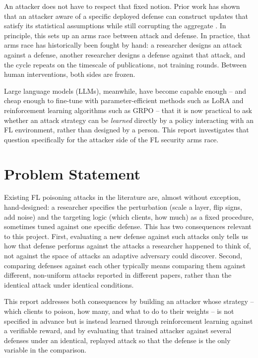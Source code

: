 An attacker does not have to respect that fixed notion. Prior work has shown that an attacker aware of a specific deployed defense can construct updates that satisfy its statistical assumptions while still corrupting the aggregate \citep{fang2020,bhagoji2019}. In principle, this sets up an arms race between attack and defense. In practice, that arms race has historically been fought by hand: a researcher designs an attack against a defense, another researcher designs a defense against that attack, and the cycle repeats on the timescale of publications, not training rounds. Between human interventions, both sides are frozen.

Large language models (LLMs), meanwhile, have become capable enough -- and cheap enough to fine-tune with parameter-efficient methods such as LoRA \citep{lora2022} and reinforcement learning algorithms such as GRPO \citep{grpo} -- that it is now practical to ask whether an attack strategy can be \emph{learned} directly by a policy interacting with an FL environment, rather than designed by a person. This report investigates that question specifically for the attacker side of the FL security arms race.

\section{Problem Statement}
\label{sec:intro-problem}

Existing FL poisoning attacks in the literature are, almost without exception, hand-designed: a researcher specifies the perturbation (scale a layer, flip signs, add noise) and the targeting logic (which clients, how much) as a fixed procedure, sometimes tuned against one specific defense. This has two consequences relevant to this project. First, evaluating a new defense against such attacks only tells us how that defense performs against the attacks a researcher happened to think of, not against the space of attacks an adaptive adversary could discover. Second, comparing defenses against each other typically means comparing them against different, non-uniform attacks reported in different papers, rather than the identical attack under identical conditions.

This report addresses both consequences by building an attacker whose strategy -- which clients to poison, how many, and what to do to their weights -- is not specified in advance but is instead learned through reinforcement learning against a verifiable reward, and by evaluating that trained attacker against several defenses under an identical, replayed attack so that the defense is the only variable in the comparison.

